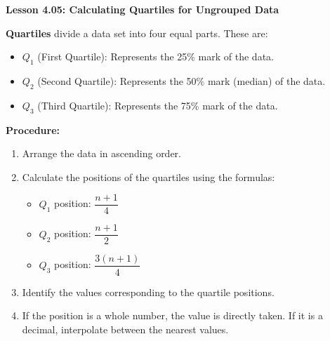 \begin{center}
\textbf{Lesson 4.05: Calculating Quartiles for Ungrouped Data}
\end{center}

\vspace*{-1.5ex}

\noindent \textbf{Quartiles} divide a data set into four equal parts. These are:

\begin{itemize}
        \item \(Q_1\) (First Quartile): Represents the 25\% mark of the data.
        \item \(Q_2\) (Second Quartile): Represents the 50\% mark (median) of the data.
        \item \(Q_3\) (Third Quartile): Represents the 75\% mark of the data.
    \end{itemize}
  
\noindent\textbf{Procedure:}  
\begin{enumerate}
    \item Arrange the data in ascending order.  
    \item Calculate the positions of the quartiles using the formulas:
    \begin{itemize}
        \item \(Q_1\) position: \(\dfrac{n+1}{4}\)  
        \item \(Q_2\) position: \(\dfrac{n+1}{2}\)  
        \item \(Q_3\) position: \(\dfrac{3(n+1)}{4}\)
    \end{itemize}
    \item Identify the values corresponding to the quartile positions.  
    \item If the position is a whole number, the value is directly taken. If it is a decimal, interpolate between the nearest values.  
\end{enumerate}

